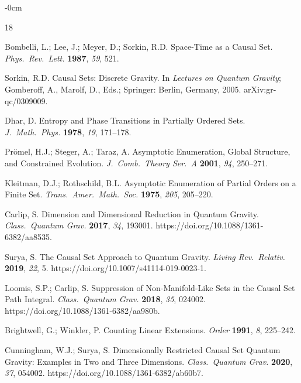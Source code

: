 \documentclass[entropy,article,submit,pdftex,moreauthors]{Definitions/mdpi}
\begin{document}
\begin{adjustwidth}{-\extralength}{0cm}


\begin{thebibliography}{18}

Bombelli, L.; Lee, J.; Meyer, D.; Sorkin, R.D.
Space-Time as a Causal Set.
\textit{Phys.\ Rev.\ Lett.} \textbf{1987}, \textit{59}, 521.

Sorkin, R.D.
Causal Sets: Discrete Gravity.
In \textit{Lectures on Quantum Gravity}; Gomberoff, A., Marolf, D., Eds.; Springer: Berlin, Germany, 2005.
arXiv:gr-qc/0309009.

Dhar, D.
Entropy and Phase Transitions in Partially Ordered Sets.
\textit{J.\ Math.\ Phys.} \textbf{1978}, \textit{19}, 171--178.

Pr\"omel, H.J.; Steger, A.; Taraz, A.
Asymptotic Enumeration, Global Structure, and Constrained Evolution.
\textit{J.\ Comb.\ Theory Ser.\ A} \textbf{2001}, \textit{94}, 250--271.

Kleitman, D.J.; Rothschild, B.L.
Asymptotic Enumeration of Partial Orders on a Finite Set.
\textit{Trans.\ Amer.\ Math.\ Soc.} \textbf{1975}, \textit{205}, 205--220.

Carlip, S.
Dimension and Dimensional Reduction in Quantum Gravity.
\textit{Class.\ Quantum Grav.} \textbf{2017}, \textit{34}, 193001.
https://doi.org/10.1088/1361-6382/aa8535.

Surya, S.
The Causal Set Approach to Quantum Gravity.
\textit{Living Rev.\ Relativ.} \textbf{2019}, \textit{22}, 5.
https://doi.org/10.1007/s41114-019-0023-1.

Loomis, S.P.; Carlip, S.
Suppression of Non-Manifold-Like Sets in the Causal Set Path Integral.
\textit{Class.\ Quantum Grav.} \textbf{2018}, \textit{35}, 024002.
https://doi.org/10.1088/1361-6382/aa980b.

Brightwell, G.; Winkler, P.
Counting Linear Extensions.
\textit{Order} \textbf{1991}, \textit{8}, 225--242.

Cunningham, W.J.; Surya, S.
Dimensionally Restricted Causal Set Quantum Gravity: Examples in Two and Three Dimensions.
\textit{Class.\ Quantum Grav.} \textbf{2020}, \textit{37}, 054002.
https://doi.org/10.1088/1361-6382/ab60b7.


\end{thebibliography}
\end{adjustwidth}
\end{document}
